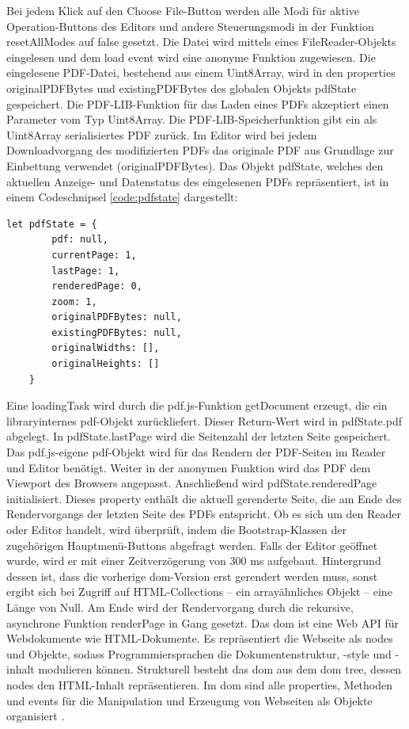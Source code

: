 Bei jedem Klick auf den Choose File-Button werden alle Modi für aktive Operation-Buttons des Editors und andere Steuerungsmodi in der Funktion resetAllModes auf false gesetzt. Die Datei wird mittels eines FileReader-Objekts eingelesen und dem load event wird eine anonyme Funktion zugewiesen. Die eingelesene PDF-Datei, bestehend aus einem Uint8Array, wird in den properties originalPDFBytes und existingPDFBytes des globalen Objekts pdfState gespeichert. Die PDF-LIB-Funktion für das Laden eines PDFs akzeptiert einen Parameter vom Typ Uint8Array. Die PDF-LIB-Speicherfunktion gibt ein als Uint8Array serialisiertes PDF zurück. Im Editor wird bei jedem Downloadvorgang des modifizierten PDFs das originale PDF aus Grundlage zur Einbettung verwendet (originalPDFBytes). Das Objekt pdfState, welches den aktuellen Anzeige- und Datenstatus des eingelesenen PDFs repräsentiert, ist in einem Codeschnipsel \ref{code:pdfstate} dargestellt:

\begin{lstlisting}[style=ES6, caption={Objekt für den Status eines geöffnetes PDF-Dokuments}, label=code:pdfstate, breaklines=true]
	let pdfState = {
		pdf: null,
		currentPage: 1,
		lastPage: 1,
		renderedPage: 0,
		zoom: 1,
		originalPDFBytes: null,
		existingPDFBytes: null,
		originalWidths: [],
		originalHeights: []
	}
\end{lstlisting} 

Eine loadingTask wird durch die pdf.js-Funktion getDocument erzeugt, die ein libraryinternes pdf-Objekt zurückliefert. Dieser Return-Wert wird in pdfState.pdf abgelegt. In pdfState.lastPage wird die Seitenzahl der letzten Seite gespeichert. Das pdf.js-eigene pdf-Objekt wird für das Rendern der PDF-Seiten im Reader und Editor benötigt. Weiter in der anonymen Funktion wird das PDF dem Viewport des Browsers angepasst. Anschließend wird pdfState.renderedPage initialisiert. Dieses property enthält die aktuell gerenderte Seite, die am Ende des Rendervorgangs der letzten Seite des PDFs entspricht. Ob es sich um den Reader oder Editor handelt, wird überprüft, indem die Bootstrap-Klassen der zugehörigen Hauptmenü-Buttons abgefragt werden. Falls der Editor geöffnet wurde, wird er mit einer Zeitverzögerung von 300 ms aufgebaut. Hintergrund dessen ist, dass die vorherige \gls{dom}-Version erst gerendert werden muss, sonst ergibt sich bei Zugriff auf HTML-Collections – ein arrayähnliches Objekt – eine Länge von Null. Am Ende wird der Rendervorgang durch die rekursive, asynchrone Funktion renderPage in Gang gesetzt. Das \gls{dom} ist eine Web API für Webdokumente wie HTML-Dokumente. Es repräsentiert die Webseite als nodes und Objekte, sodass Programmiersprachen die Dokumentenstruktur, -style und -inhalt modulieren können. Strukturell besteht das \gls{dom} aus dem \gls{dom} tree, dessen nodes den HTML-Inhalt repräsentieren. Im \gls{dom} sind alle properties, Methoden und events für die Manipulation und Erzeugung von Webseiten als Objekte organisiert \cite{mozilla-dom}. 

